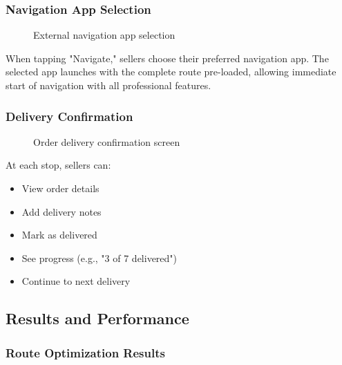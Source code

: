 \documentclass[12pt,a4paper]{article}
\begin{document}
\subsubsection{Navigation App Selection}

\begin{figure}[h]
    \centering
    \caption{External navigation app selection}
\end{figure}

When tapping "Navigate," sellers choose their preferred navigation app. The selected app launches with the complete route pre-loaded, allowing immediate start of navigation with all professional features.

\subsubsection{Delivery Confirmation}

\begin{figure}[h]
    \centering
    \caption{Order delivery confirmation screen}
\end{figure}

At each stop, sellers can:
\begin{itemize}
    \item View order details
    \item Add delivery notes
    \item Mark as delivered
    \item See progress (e.g., "3 of 7 delivered")
    \item Continue to next delivery
\end{itemize}

\subsection{Results and Performance}

\subsubsection{Route Optimization Results}
\end{document}

